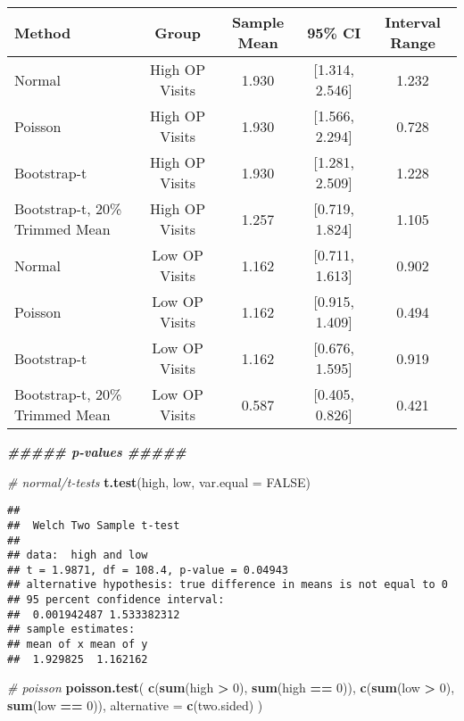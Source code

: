 \documentclass[
]{article}
\newenvironment{Shaded}{\begin{snugshade}}{\end{snugshade}}
\newcommand{\AttributeTok}[1]{\textcolor[rgb]{0.13,0.29,0.53}{#1}}
\newcommand{\CommentTok}[1]{\textcolor[rgb]{0.56,0.35,0.01}{\textit{#1}}}
\newcommand{\ConstantTok}[1]{\textcolor[rgb]{0.56,0.35,0.01}{#1}}
\newcommand{\DecValTok}[1]{\textcolor[rgb]{0.00,0.00,0.81}{#1}}
\newcommand{\DocumentationTok}[1]{\textcolor[rgb]{0.56,0.35,0.01}{\textbf{\textit{#1}}}}
\newcommand{\FunctionTok}[1]{\textcolor[rgb]{0.13,0.29,0.53}{\textbf{#1}}}
\newcommand{\NormalTok}[1]{#1}
\newcommand{\SpecialCharTok}[1]{\textcolor[rgb]{0.81,0.36,0.00}{\textbf{#1}}}
\newcommand{\StringTok}[1]{\textcolor[rgb]{0.31,0.60,0.02}{#1}}
\begin{document}
\begin{longtable}[t]{lcccc}
\toprule
Method & Group & Sample Mean & 95\% CI & Interval Range\\
\midrule
Normal & High OP Visits & 1.930 & {}[1.314, 2.546] & 1.232\\
Poisson & High OP Visits & 1.930 & {}[1.566, 2.294] & 0.728\\
Bootstrap-t & High OP Visits & 1.930 & {}[1.281, 2.509] & 1.228\\
Bootstrap-t, 20\% Trimmed Mean & High OP Visits & 1.257 & {}[0.719, 1.824] & 1.105\\
\midrule
Normal & Low OP Visits & 1.162 & {}[0.711, 1.613] & 0.902\\
\addlinespace
Poisson & Low OP Visits & 1.162 & {}[0.915, 1.409] & 0.494\\
Bootstrap-t & Low OP Visits & 1.162 & {}[0.676, 1.595] & 0.919\\
Bootstrap-t, 20\% Trimmed Mean & Low OP Visits & 0.587 & {}[0.405, 0.826] & 0.421\\
\bottomrule
\end{longtable}

\begin{Shaded}
\begin{Highlighting}[]
\DocumentationTok{\#\#\#\#\# p{-}values \#\#\#\#\#}

\CommentTok{\# normal/t{-}tests}
\FunctionTok{t.test}\NormalTok{(high, low, }\AttributeTok{var.equal =} \ConstantTok{FALSE}\NormalTok{)}
\end{Highlighting}
\end{Shaded}

\begin{verbatim}
## 
##  Welch Two Sample t-test
## 
## data:  high and low
## t = 1.9871, df = 108.4, p-value = 0.04943
## alternative hypothesis: true difference in means is not equal to 0
## 95 percent confidence interval:
##  0.001942487 1.533382312
## sample estimates:
## mean of x mean of y 
##  1.929825  1.162162
\end{verbatim}

\begin{Shaded}
\begin{Highlighting}[]
\CommentTok{\# poisson}
\FunctionTok{poisson.test}\NormalTok{(}
    \FunctionTok{c}\NormalTok{(}\FunctionTok{sum}\NormalTok{(high }\SpecialCharTok{\textgreater{}} \DecValTok{0}\NormalTok{), }\FunctionTok{sum}\NormalTok{(high }\SpecialCharTok{==} \DecValTok{0}\NormalTok{)),}
    \FunctionTok{c}\NormalTok{(}\FunctionTok{sum}\NormalTok{(low }\SpecialCharTok{\textgreater{}} \DecValTok{0}\NormalTok{), }\FunctionTok{sum}\NormalTok{(low }\SpecialCharTok{==} \DecValTok{0}\NormalTok{)),}
    \AttributeTok{alternative =} \FunctionTok{c}\NormalTok{(}\StringTok{\textquotesingle{}two.sided\textquotesingle{}}\NormalTok{)}
\NormalTok{)}
\end{Highlighting}
\end{Shaded}
\end{document}
